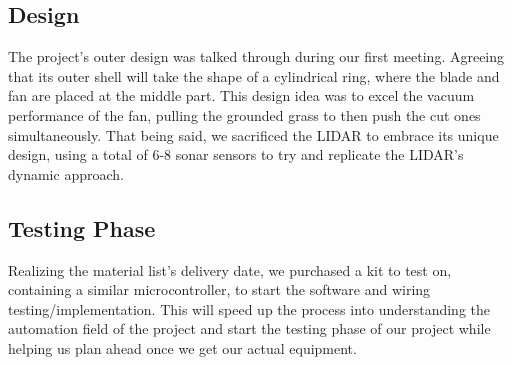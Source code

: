 \subsection{Design}
The project's outer design was talked through during our first meeting. Agreeing that its outer shell will take the shape of a cylindrical ring, where the blade and fan are placed at the middle part. This design idea was to excel the vacuum performance of the fan, pulling the grounded grass to then push the cut ones simultaneously. That being said, we sacrificed the LIDAR to embrace its unique design, using a total of 6-8 sonar sensors to try and replicate the LIDAR's dynamic approach. \par

\subsection{Testing Phase}
Realizing the material list's delivery date, we purchased a kit to test on, containing a similar microcontroller, to start the software and wiring testing/implementation. This will speed up the process into understanding the automation field of the project and start the testing phase of our project while helping us plan ahead once we get our actual equipment. \par
